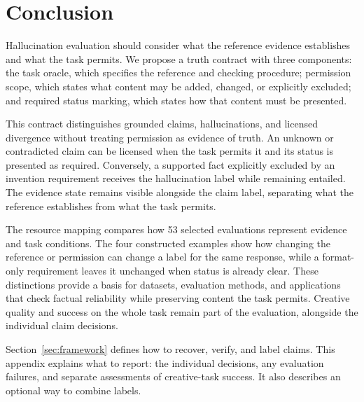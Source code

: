 \documentclass{clv2025}
\begin{document}
\section{Conclusion}\label{sec:conclusion}

Hallucination evaluation should consider what the reference evidence
establishes and what the task permits. We propose a truth contract with
three components: the task oracle, which specifies the reference and checking
procedure; permission scope, which states what content may be added, changed,
or explicitly excluded; and required status marking, which states how that content must
be presented.

This contract distinguishes grounded claims, hallucinations, and licensed
divergence without treating permission as evidence of truth. An unknown or
contradicted claim can be licensed when the task permits it and its status
is presented as required. Conversely, a supported fact explicitly excluded
by an invention requirement receives the hallucination label while remaining
entailed. The evidence state remains visible alongside the claim label,
separating what the reference establishes from what the task permits.

The resource mapping compares how 53 selected evaluations represent evidence
and task conditions. The four constructed examples show how changing the
reference or permission can change a label for the same response, while
a format-only requirement leaves it unchanged when status is already clear. These distinctions provide a basis for datasets, evaluation
methods, and applications that check factual reliability while preserving
content the task permits. Creative quality and success on the whole task
remain part of the evaluation, alongside the individual claim decisions.

\clearpage

\appendix

%
\makeatletter\def\@currentlabel{A}\makeatother\label{app:diagnostics}

Section~\ref{sec:framework} defines how to recover, verify, and label claims.
This appendix explains what to report: the individual decisions, any
evaluation failures, and separate assessments of creative-task success.
It also describes an optional way to combine labels.
\end{document}
